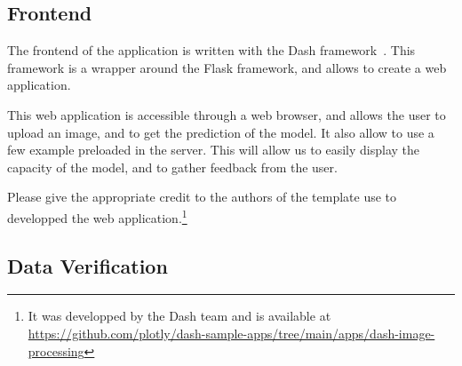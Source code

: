 \documentclass[11pt]{article}
\begin{document}
        \subsection{Frontend}

            The frontend of the application is written with the Dash framework~\cite{dash}. This framework is a wrapper around the Flask framework, and allows to create a web application.

            This web application is accessible through a web browser, and allows the user to upload an image, and to get the prediction of the model. It also allow to use a few example
            preloaded in the server. This will allow us to easily display the capacity of the model, and to gather feedback from the user.

            Please give the appropriate credit to the authors of the template use to developped the web application.\footnote{It was developped by the Dash team and is available
            at \url{https://github.com/plotly/dash-sample-apps/tree/main/apps/dash-image-processing}}


        \subsection{Data Verification}
    \newpage
    {
    \small

    \printbibliography
    }
\end{document}
